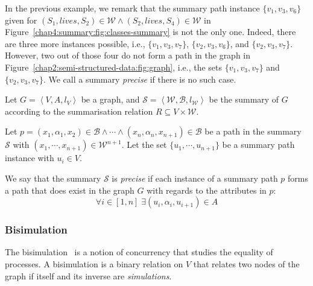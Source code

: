 In the previous example, we remark that the summary path instance $\{v_1, v_3, v_6\}$ given for $(S_1, lives, S_2) \in \mathcal{W} \wedge (S_2, lives, S_4) \in \mathcal{W}$ in Figure~\ref{chap4:summary:fig:classes-summary} is not the only one. Indeed, there are three more instances possible, i.e., $\{v_1, v_3, v_7\}$, $\{v_2, v_3, v_6\}$, and $\{v_2, v_3, v_7\}$. However, two out of those four do not form a path in the graph in Figure~\ref{chap2:semi-structured-data:fig:graph}, i.e., the sets $\{v_1, v_3, v_7\}$ and $\{v_2, v_3, v_7\}$. We call a summary \emph{precise} if there is no such case.

\begin{definition}
\label{chap4:summary:def:precise-summary}
Let $G=\left\langle V, A, l_V \right\rangle$ be a graph, and $\mathcal{S} = \left\langle \mathcal{W}, \mathcal{B}, l_{\mathcal{W}} \right\rangle$ be the summary of $G$ according to the summarisation relation $R \subseteq V \times \mathcal{W}$.

Let $p = (x_1, \alpha_1, x_2) \in \mathcal{B} \wedge \cdots \wedge (x_n, \alpha_n, x_{n+1}) \in \mathcal{B}$ be a path in the summary $\mathcal{S}$ with $(x_1, \cdots, x_{n+1}) \in \mathcal{W}^{n+1}$. Let the set $\{ u_1, \cdots, u_{n+1} \}$ be a summary path instance with $u_i \in V$.

We say that the summary $\mathcal{S}$ is \emph{precise} if each instance of a summary path $p$ forms a path that does exist in the graph $G$ with regards to the \gls{attributes} in $p$:
$$
\forall i \in [1, n ]\; \exists \left(u_i, \alpha_i, u_{i+1} \right) \in A
$$
\end{definition}

\subsubsection{Bisimulation}
\label{chap4:summary:bisim}

The bisimulation~\cite{park:1981:cai} is a notion of concurrency that studies the equality of processes.
A bisimulation is a binary relation on $V$ that relates two nodes of the graph if itself and its inverse are \emph{simulations}.

